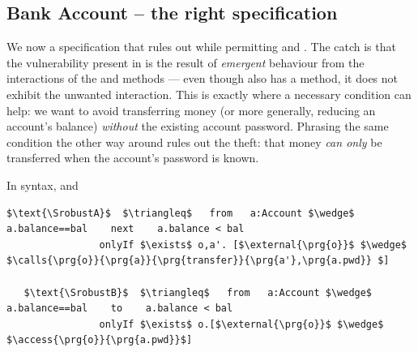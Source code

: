  \subsection{Bank Account -- the right specification}
\label{s:bankSpecEx}

We now  a specification that rules out \ModB while permitting \ModA and
\ModC. The catch is that the vulnerability present in \ModB is the result
of  \emph{emergent} behaviour from the interactions of the 
and  methods --- even though \ModC also has a
 method, it does not exhibit the unwanted interaction.
This is exactly where a necessary condition can help:
we want to avoid transferring money
(or more generally, reducing an account's balance)
\textit{without} the existing account password.  Phrasing the same condition
the other way around %
rules out the theft: that money \textit{can only} be
transferred when the account's password is known.


In \Nec  syntax, and 
 

%
%
%
%
%
%
\begin{lstlisting}[language = Chainmail, mathescape=true, frame=lines]
   $\text{\SrobustA}$  $\triangleq$   from   a:Account $\wedge$ a.balance==bal    next    a.balance < bal
                onlyIf $\exists$ o,a'. [$\external{\prg{o}}$ $\wedge$ $\calls{\prg{o}}{\prg{a}}{\prg{transfer}}{\prg{a'},\prg{a.pwd}} $]    
                
   $\text{\SrobustB}$  $\triangleq$   from   a:Account $\wedge$ a.balance==bal    to    a.balance < bal
                onlyIf $\exists$ o.[$\external{\prg{o}}$ $\wedge$ $\access{\prg{o}}{\prg{a.pwd}}$]    
           
\end{lstlisting}
%
%
% 


